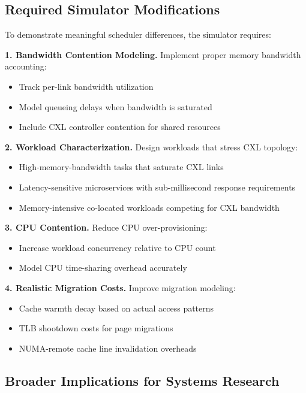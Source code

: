 \documentclass[11pt]{article}
\begin{document}
\subsection{Required Simulator Modifications}

To demonstrate meaningful scheduler differences, the simulator requires:

\textbf{1. Bandwidth Contention Modeling.} Implement proper memory bandwidth accounting:
\begin{itemize}
    \item Track per-link bandwidth utilization
    \item Model queueing delays when bandwidth is saturated
    \item Include CXL controller contention for shared resources
\end{itemize}

\textbf{2. Workload Characterization.} Design workloads that stress CXL topology:
\begin{itemize}
    \item High-memory-bandwidth tasks that saturate CXL links
    \item Latency-sensitive microservices with sub-millisecond response requirements
    \item Memory-intensive co-located workloads competing for CXL bandwidth
\end{itemize}

\textbf{3. CPU Contention.} Reduce CPU over-provisioning:
\begin{itemize}
    \item Increase workload concurrency relative to CPU count
    \item Model CPU time-sharing overhead accurately
\end{itemize}

\textbf{4. Realistic Migration Costs.} Improve migration modeling:
\begin{itemize}
    \item Cache warmth decay based on actual access patterns
    \item TLB shootdown costs for page migrations
    \item NUMA-remote cache line invalidation overheads
\end{itemize}

\subsection{Broader Implications for Systems Research}
\end{document}
